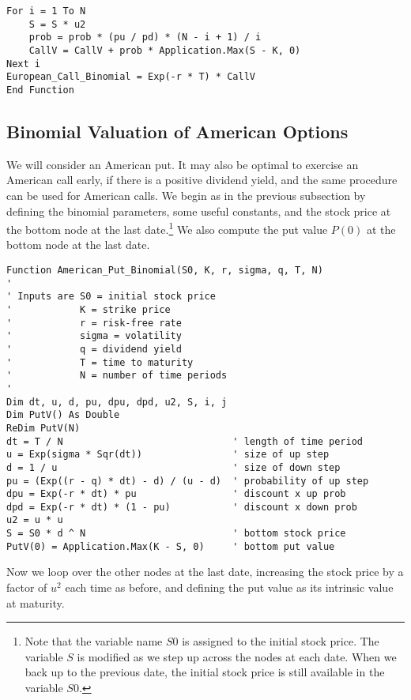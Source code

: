 \small\begin{verbatim}
For i = 1 To N                                
    S = S * u2                                       
    prob = prob * (pu / pd) * (N - i + 1) / i        
    CallV = CallV + prob * Application.Max(S - K, 0) 
Next i
European_Call_Binomial = Exp(-r * T) * CallV
End Function
\end{verbatim}\normalsize

\subsection*{Binomial Valuation of American Options}
We will consider an American put.  It may also be optimal to exercise an American call early, if there is a positive dividend yield, and the same procedure can be used for American calls.
We begin as in the previous subsection by defining the binomial parameters, some useful constants, and the stock price at the bottom node at the last date.\footnote{Note that the variable name $S0$ is assigned to the initial stock price.  The variable $S$ is modified as we step up across the nodes at each date.  When we back up to the previous date, the initial stock price is still available in the variable $S0$.} We also compute the put value $P(0)$ at the bottom node at the last date.


\small\begin{verbatim}
Function American_Put_Binomial(S0, K, r, sigma, q, T, N)
'
' Inputs are S0 = initial stock price
'            K = strike price
'            r = risk-free rate
'            sigma = volatility
'            q = dividend yield
'            T = time to maturity
'            N = number of time periods
'
Dim dt, u, d, pu, dpu, dpd, u2, S, i, j
Dim PutV() As Double
ReDim PutV(N)
dt = T / N                              ' length of time period
u = Exp(sigma * Sqr(dt))                ' size of up step
d = 1 / u                               ' size of down step
pu = (Exp((r - q) * dt) - d) / (u - d)  ' probability of up step
dpu = Exp(-r * dt) * pu                 ' discount x up prob 
dpd = Exp(-r * dt) * (1 - pu)           ' discount x down prob
u2 = u * u
S = S0 * d ^ N                          ' bottom stock price
PutV(0) = Application.Max(K - S, 0)     ' bottom put value
\end{verbatim}\normalsize

Now we loop over the other nodes at the last date, increasing the stock price by a factor of $u^2$ each time as before, and defining the put value as its intrinsic value at maturity.

